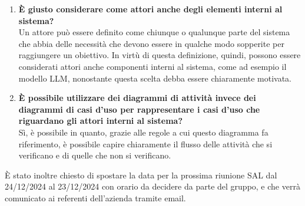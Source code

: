 \begin{enumerate}
\begin{enumerate}[label=\Alph*)]
        In questo caso si potrebbe evitare di creare l'alternativa testuale, ma sarebbe più complesso gestire il reperimento delle immagini nel database. Una possibilità per la gestione di questa problematica potrebbe essere inserire in linguaggio naturale un contesto iniziale da passare al modello per istruirlo a svolgere questa operazione di ricerca dell'immagine oltre alle informazioni testuali. Viene comunque consigliato di analizzare per gradi il problema dell'embedding delle immagini e di trascurarlo per il momento in favore dell'embedding del testo, ritenuto più importante e semplice.
        \item \textbf{\`E giusto considerare come attori anche degli elementi interni al sistema?}\\
        Un attore può essere definito come chiunque o qualunque parte del sistema che abbia delle necessità che devono essere in qualche modo sopperite per raggiungere un obiettivo. In virtù di questa definizione, quindi, possono essere considerati attori anche componenti interni al sistema, come ad esempio il modello LLM, nonostante questa scelta debba essere chiaramente motivata.
        \item \textbf{\`E possibile utilizzare dei diagrammi di attività invece dei diagrammi di casi d'uso per rappresentare i casi d'uso che riguardano gli attori interni al sistema?}\\
        S\`i, è possibile in quanto, grazie alle regole a cui questo diagramma fa riferimento, è possibile capire chiaramente il flusso delle attività che si verificano e di quelle che non si verificano.
    \end{enumerate}
    \`E stato inoltre chiesto di spostare la data per la prossima riunione SAL dal 24/12/2024 al 23/12/2024 con orario da decidere da parte del gruppo, e che verrà comunicato ai referenti dell'azienda tramite email.
\end{enumerate}